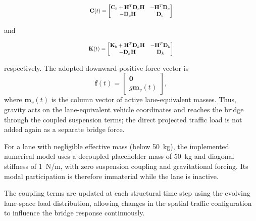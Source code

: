 \documentclass[journal]{IEEEtran}
\begin{document}
\begin{equation}
\scalebox{0.78}{$\displaystyle
\mathbf{C}(t)=
\begin{bmatrix}
\mathbf{C}_b+\mathbf{H}^{T}\mathbf{D}_c\mathbf{H}
&
-\mathbf{H}^{T}\mathbf{D}_c\\
-\mathbf{D}_c\mathbf{H}
&
\mathbf{D}_c
\end{bmatrix}
$}
\label{eq:assembled_damping}
\end{equation}

and

\begin{equation}
\scalebox{0.78}{$\displaystyle
\mathbf{K}(t)=
\begin{bmatrix}
\mathbf{K}_b+\mathbf{H}^{T}\mathbf{D}_k\mathbf{H}
&
-\mathbf{H}^{T}\mathbf{D}_k\\
-\mathbf{D}_k\mathbf{H}
&
\mathbf{D}_k
\end{bmatrix}
$}
\label{eq:assembled_stiffness}
\end{equation}

respectively. The adopted downward-positive force vector is
\begin{equation}
\mathbf{f}(t)=
\begin{bmatrix}
\mathbf{0}\\ g\mathbf{m}_v(t)
\end{bmatrix},
\label{eq:assembled_force}
\end{equation}
where $\mathbf{m}_v(t)$ is the column vector of active
lane-equivalent masses. Thus, gravity acts on the lane-equivalent
vehicle coordinates and reaches the bridge through the coupled
suspension terms; the direct projected traffic load is not added
again as a separate bridge force.

For a lane with negligible effective mass (below 50~kg),
the implemented numerical model uses a decoupled placeholder
mass of 50~kg and diagonal stiffness of 1~N/m, with zero
suspension coupling and gravitational forcing. Its modal
participation is therefore immaterial while the lane is inactive.


The coupling terms are updated at each structural time step using the evolving lane-space load distribution, allowing changes in the spatial traffic configuration to influence the bridge response continuously.
\end{document}
